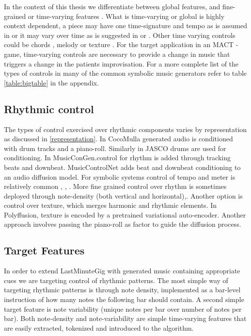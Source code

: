 In the context of this thesis we differentiate between global features, and fine-grained or time-varying features \cite{Rütte_figaro_2023}. What is time-varying or global is highly context dependent, a piece may have one time-signature and tempo as is assumed in \cite{Lu_Xu_Kang_Yu_Xing_Tan_Bian_MuseCoco_2023} or it may vary over time as is suggested in \cite{Rütte_figaro_2023} or \cite{Huang_Yang_remi_pop_transformer_2020}. Other time varying controls could be chords \cite{Rütte_figaro_2023}\cite{Wu_Donahue_musicontrolnet_2023}\cite{Lan_Hsiao_Cheng_Yang_musicongen_2024}\cite{Min_Jiang_Xia_Zhao_polyffusion_2023}, melody \cite{copet2023simple}\cite{Min_Jiang_Xia_Zhao_polyffusion_2023} or texture \cite{Min_Jiang_Xia_Zhao_polyffusion_2023}. For the target application in an MACT - game, time-varying controls are necessary to provide a change in music that triggers a change in the patients improvisation.
For a more complete list of the types of controls in many of the common symbolic music generators refer to table \ref{table:bigtable}
in the appendix.

\subsection{Rhythmic control}
The types of control exercised over rhythmic components varies by representation as discussed in \ref{representation}. In CocoMulla \cite{Lin_cocomulla_2024} generated audio is conditioned with drum tracks and a piano-roll. Similarly in JASCO\cite{Tal_jasco} drums are used for conditioning. In MusicConGen.\cite{Lan_Hsiao_Cheng_Yang_musicongen_2024}control for rhythm is added through tracking beats and downbeat. MusicControlNet\cite{Wu_Donahue_musicontrolnet_2023} adds beat and downbeat conditioning to an audio diffusion model.
For symbolic systems control of tempo and meter is relatively common \cite{Rütte_figaro_2023}, \cite{Huang_Yang_remi_pop_transformer_2020}, \cite{Lu_Xu_Kang_Yu_Xing_Tan_Bian_MuseCoco_2023}. More fine grained control over rhythm is sometimes deployed through note-density (both vertical and horizontal)\cite{Rütte_figaro_2023},\cite{Huang_rule_diffusion_2024}.  Another option is control over texture, which merges harmonic and rhythmic elements. In Polyffusion\cite{Min_Jiang_Xia_Zhao_polyffusion_2023}, texture is encoded by a pretrained variational auto-encoder\cite{Wang_vae_chord_rhythm_2020}. Another approach \cite{Zhu_Liu_Jiang_Zheng_texture_2024} involves passing the piano-roll as factor to guide the diffusion process.

\subsection{Target Features}
In order to extend LastMinuteGig with generated music containing appropriate cues we are targeting control of rhythmic patterns. The most simple way of targeting rhythmic patterns is through note density, implemented as a bar-level instruction of how many notes the following bar should contain. A second simple target feature is note variability (unique notes per bar over number of notes per bar). Both note-density and note-variability are simple time-varying features that are easily extracted, tokenized and introduced to the algorithm.  

